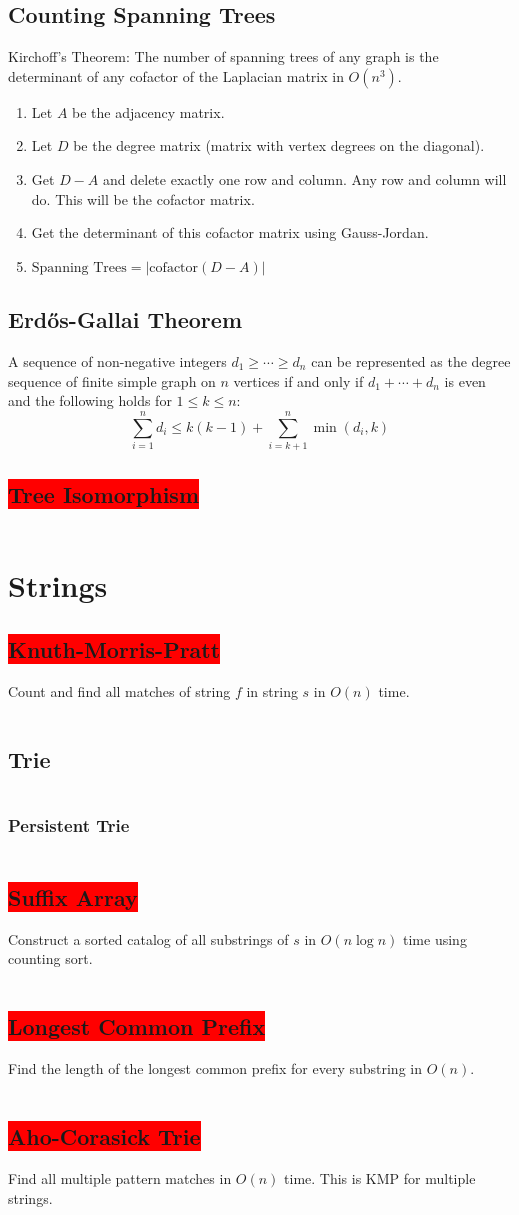 \documentclass[8pt,a4paper,landscape,oneside]{amsart}
\newcommand{\code}[1]{\inputminted[fontsize=\normalsize,baselinestretch=1]{cpp}{_code/#1}}
\newcommand{\subsectionRed}[1]{\subsection{\colorbox{red}{\color{white}#1}}}
\begin{document}
\begin{multicols*}{3}
  \subsection{Counting Spanning Trees}
    Kirchoff's Theorem: The number of spanning trees of any graph is the
    determinant of any cofactor of the Laplacian matrix in $O(n^3)$.
    \begin{enumerate}
        \item Let $A$ be the adjacency matrix.
        \item Let $D$ be the degree matrix (matrix with vertex degrees on the diagonal).
        \item Get $D-A$ and delete exactly one row and column. Any row and
        column will do. This will be the cofactor matrix.
        \item Get the determinant of this cofactor matrix using Gauss-Jordan.
        \item $\text{Spanning Trees} = \left|\mathrm{cofactor}(D-A) \right|$
    \end{enumerate}
  \subsection{Erd\H{o}s-Gallai Theorem}
    A sequence of non-negative integers $d_1 \ge \cdots \ge d_n$ can be represented as the
    degree sequence of finite simple graph on $n$ vertices if and only if $d_1 + \cdots + d_n$ is
    even and the following holds for $1 \le k \le n$:
    \[
    \sum_{i=1}^n d_i \le k(k-1) + \sum_{i=k+1}^n \min\left(d_i, k\right)
    \]
  \subsectionRed{Tree Isomorphism}
    \code{graphs/tree_isomorphism.cpp}
\section{Strings}
  \subsectionRed{Knuth-Morris-Pratt}
    Count and find all matches of string $f$ in string $s$ in $O(n)$ time.
    \code{strings/kmp.cpp}
  \subsection{Trie}
    \code{strings/trie.cpp}
    \subsubsection{Persistent Trie}
      \code{strings/trie_persistent.cpp}
  \subsectionRed{Suffix Array}
    Construct a sorted catalog of all substrings of $s$ in $O(n \log n)$ time using counting sort.
    \code{strings/suffix-array.cpp}
  \subsectionRed{Longest Common Prefix}
    Find the length of the longest common prefix for every substring in $O(n)$.
    \code{strings/lcp.cpp}
  \subsectionRed{Aho-Corasick Trie}
    Find all multiple pattern matches in $O(n)$ time. This is KMP for multiple strings.
    \code{strings/aho-corasick-trie.java}

\end{multicols*}
\end{document}
